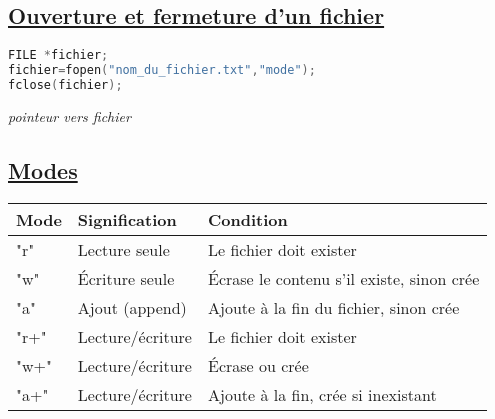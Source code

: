 \documentclass[a3paper,12pt]{article}
\begin{document}
\begin{minipage}[t]{0.5\textwidth}
\begin{tcolorbox}[title=Manipulation de fichiers, fonttitle=\large, top=5.5pt, bottom=5pt, boxsep=1pt, colback=white,
  colframe=orange!50!black!40, 
  colbacktitle=orange!50!black!40,
  coltitle=white,]
\subsection*{{\small \underline{Ouverture et fermeture d'un fichier}}}
\vspace{-1.25em}
\noindent
\begin{minipage}[t]{0.5\textwidth} 
\begin{lstlisting}[language=C, basicstyle=\normalsize, aboveskip=0pt, belowskip=0pt,showstringspaces=false]
FILE *fichier;
fichier=fopen("nom_du_fichier.txt","mode");
fclose(fichier);
\end{lstlisting}
\end{minipage}%
\hfill
\begin{minipage}[t]{0.45\textwidth}
\vspace{0.15em}
\textit{pointeur vers fichier}
\end{minipage}
  \vspace{-0.75em}
\subsection*{{\small \underline{Modes}}}
\begin{tabular}{|l|l|p{7.77cm}|}
\hline
\textbf{Mode} & \textbf{Signification} & \textbf{Condition}\\
\hline
"r" & Lecture seule & Le fichier doit exister\\
\hline
"w" & Écriture seule & Écrase le contenu s’il existe, sinon crée\\
\hline
"a"	& Ajout (append) & Ajoute à la fin du fichier, sinon crée\\
\hline
"r+" & Lecture/écriture	& Le fichier doit exister\\
\hline
"w+"	 & Lecture/écriture &	Écrase ou crée\\
\hline
"a+" & 	Lecture/écriture & 	Ajoute à la fin, crée si inexistant\\
\hline
\end{tabular}
\vspace{-1em}

\end{tcolorbox}
\end{minipage}
\end{document}
